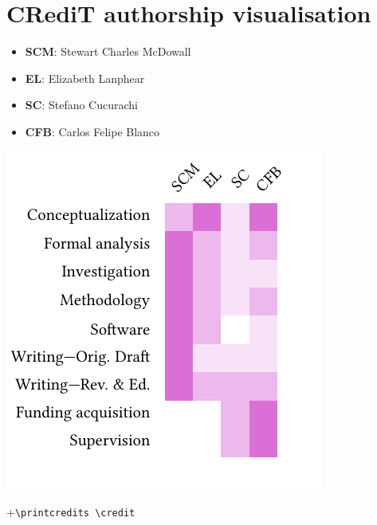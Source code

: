 \documentclass[a4paper,fleqn]{cas-dc}
\begin{document}
\section*{CRediT authorship visualisation} %

\begin{itemize}
	\item \textbf{SCM}: Stewart Charles McDowall
	\item \textbf{EL}: Elizabeth Lanphear
	\item \textbf{SC}: Stefano Cucurachi
	\item \textbf{CFB}: Carlos Felipe Blanco
\end{itemize}

\includegraphics[width=0.9\columnwidth]{figures/T-reX_credit_heatmap.pdf}


+\verb+\printcredits +\verb+\credit+ \printcredits


%





%
\end{document}
